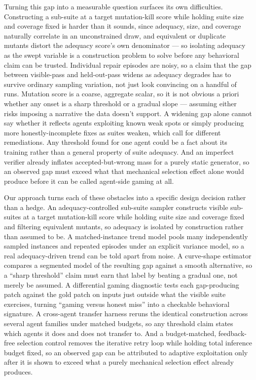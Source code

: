 \documentclass[11pt]{article}
\begin{document}
Turning this gap into a measurable question surfaces its own difficulties. Constructing a sub-suite at a target mutation-kill score while holding suite size and coverage fixed is harder than it sounds, since adequacy, size, and coverage naturally correlate in an unconstrained draw, and equivalent or duplicate mutants distort the adequacy score's own denominator --- so isolating adequacy as the swept variable is a construction problem to solve before any behavioral claim can be trusted. Individual repair episodes are noisy, so a claim that the gap between visible-pass and held-out-pass widens as adequacy degrades has to survive ordinary sampling variation, not just look convincing on a handful of runs. Mutation score is a coarse, aggregate scalar, so it is not obvious a priori whether any onset is a sharp threshold or a gradual slope --- assuming either risks imposing a narrative the data doesn't support. A widening gap alone cannot say whether it reflects agents exploiting known weak spots or simply producing more honestly-incomplete fixes as suites weaken, which call for different remediations. Any threshold found for one agent could be a fact about its training rather than a general property of suite adequacy. And an imperfect verifier already inflates accepted-but-wrong mass for a purely static generator, so an observed gap must exceed what that mechanical selection effect alone would produce before it can be called agent-side gaming at all.

Our approach turns each of these obstacles into a specific design decision rather than a hedge. An adequacy-controlled sub-suite sampler constructs visible sub-suites at a target mutation-kill score while holding suite size and coverage fixed and filtering equivalent mutants, so adequacy is isolated by construction rather than assumed to be. A matched-instance trend model pools many independently sampled instances and repeated episodes under an explicit variance model, so a real adequacy-driven trend can be told apart from noise. A curve-shape estimator compares a segmented model of the resulting gap against a smooth alternative, so a ``sharp threshold'' claim must earn that label by beating a gradual one, not merely be assumed. A differential gaming diagnostic tests each gap-producing patch against the gold patch on inputs just outside what the visible suite exercises, turning ``gaming versus honest miss'' into a checkable behavioral signature. A cross-agent transfer harness reruns the identical construction across several agent families under matched budgets, so any threshold claim states which agents it does and does not transfer to. And a budget-matched, feedback-free selection control removes the iterative retry loop while holding total inference budget fixed, so an observed gap can be attributed to adaptive exploitation only after it is shown to exceed what a purely mechanical selection effect already produces.
\end{document}
